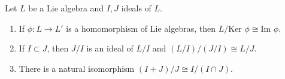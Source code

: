 Let $L$ be a Lie algebra and $I, J$ ideals of $L$.
\begin{enumerate}
\item[(a)] If $\phi: L \rightarrow L'$ is a homomorphism of Lie algebras, then $L/\text{Ker } \phi \cong \text{Im } \phi$.
\item[(b)] If $I \subset J$, then $J/I$ is an ideal of $L/I$ and $(L/I)/(J/I) \cong L/J$.
\item[(c)] There is a natural isomorphism $(I+J)/J \cong I/(I \cap J)$.
\end{enumerate}

